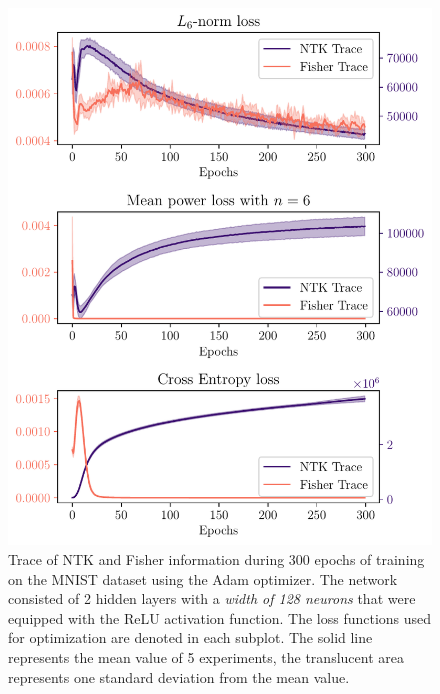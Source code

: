 \begin{figure}
	\centering
	\includegraphics{text/results/FisherNTKComparisonPlots/Triple_comparison_losses6_128.pdf}
	\caption{Trace of NTK and Fisher information during 300 epochs of training on the MNIST dataset using the Adam optimizer. The network consisted of 2 hidden layers with a \emph{width of 128 neurons} that were equipped with the ReLU activation function. The loss functions used for optimization are denoted in each subplot. The solid line represents the mean value of 5 experiments, the translucent area represents one standard deviation from the mean value.}
	\label{fig:MNISTTraceComparison2}
\end{figure}

